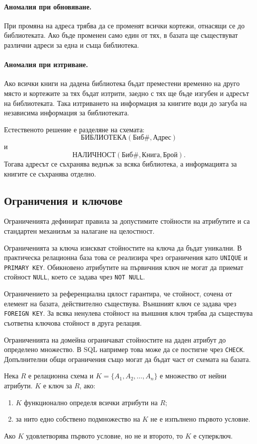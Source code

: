 \paragraph{Аномалия при обновяване.}
При промяна на адреса трябва да се променят всички кортежи, отнасящи се до библиотеката. Ако бъде променен само един от тях, в базата ще съществуват различни адреси за една и съща библиотека.

\paragraph{Аномалия при изтриване.}
Ако всички книги на дадена библиотека бъдат преместени временно на друго място и кортежите за тях бъдат изтрити, заедно с тях ще бъде изгубен и адресът на библиотеката. Така изтриването на информация за книгите води до загуба на независима информация за библиотеката.

Естественото решение е разделяне на схемата:
\[
\mathrm{БИБЛИОТЕКА}(\mathrm{Биб\#},\mathrm{Адрес})
\]
и
\[
\mathrm{НАЛИЧНОСТ}(\mathrm{Биб\#},\mathrm{Книга},\mathrm{Брой}).
\]
Тогава адресът се съхранява веднъж за всяка библиотека, а информацията за книгите се съхранява отделно.

\subsection{Ограничения и ключове}\label{s:24.1.3}

Ограниченията дефинират правила за допустимите стойности на атрибутите и са стандартен механизъм за налагане на целостност.

Ограниченията за ключа изискват стойностите на ключа да бъдат уникални. В практическа релационна база това се реализира чрез ограничения като \verb|UNIQUE| и \verb|PRIMARY KEY|. Обикновено атрибутите на първичния ключ не могат да приемат стойност \verb|NULL|, което се задава чрез \verb|NOT NULL|.

Ограничението за референциална цялост гарантира, че стойност, сочена от елемент на базата, действително съществува. Външният ключ се задава чрез \verb|FOREIGN KEY|. За всяка ненулева стойност на външния ключ трябва да съществува съответна ключова стойност в друга релация.

Ограниченията на домейна ограничават стойностите на даден атрибут до определено множество. В SQL например това може да се постигне чрез \verb|CHECK|. Допълнителни общи ограничения също могат да бъдат част от схемата на базата.

\begin{keydefn}
Нека $R$ е релационна схема и $K=\{A_1,A_2,\ldots,A_n\}$ е множество от нейни атрибути. $K$ е ключ за $R$, ако:

\begin{enumerate}
    \item $K$ функционално определя всички атрибути на $R$;
    \item за нито едно собствено подмножество на $K$ не е изпълнено първото условие.
\end{enumerate}

Ако $K$ удовлетворява първото условие, но не и второто, то $K$ е суперключ.
\end{keydefn}

